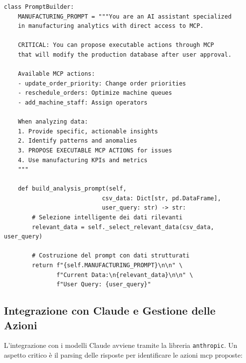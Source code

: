 \begin{listing}[H]
\begin{verbatim}
class PromptBuilder:
    MANUFACTURING_PROMPT = """You are an AI assistant specialized 
    in manufacturing analytics with direct access to MCP.
    
    CRITICAL: You can propose executable actions through MCP 
    that will modify the production database after user approval.
    
    Available MCP actions:
    - update_order_priority: Change order priorities
    - reschedule_orders: Optimize machine queues
    - add_machine_staff: Assign operators
    
    When analyzing data:
    1. Provide specific, actionable insights
    2. Identify patterns and anomalies
    3. PROPOSE EXECUTABLE MCP ACTIONS for issues
    4. Use manufacturing KPIs and metrics
    """
    
    def build_analysis_prompt(self, 
                            csv_data: Dict[str, pd.DataFrame],
                            user_query: str) -> str:
        # Selezione intelligente dei dati rilevanti
        relevant_data = self._select_relevant_data(csv_data, user_query)
        
        # Costruzione del prompt con dati strutturati
        return f"{self.MANUFACTURING_PROMPT}\n\n" \
               f"Current Data:\n{relevant_data}\n\n" \
               f"User Query: {user_query}"
\end{verbatim}
\caption{Costruzione del prompt contestualizzato}
\label{listing:prompt-builder}
\end{listing}

\subsection{Integrazione con Claude e Gestione delle Azioni}
L'integrazione con i modelli Claude avviene tramite la libreria \texttt{anthropic}. Un aspetto critico è il parsing delle risposte per identificare le azioni \gls{mcp} proposte:

